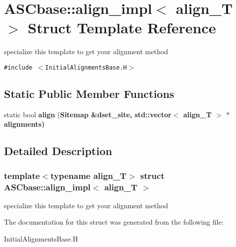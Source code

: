 \section{ASCbase::align\_\-impl$<$ align\_\-T $>$ Struct Template Reference}
\label{structASCbase_1_1align__impl}
specialize this template to get your alignment method  


{\tt \#include $<$Initial\-Alignments\-Base.H$>$}

\subsection*{Static Public Member Functions}
\begin{CompactItemize}
\item 
static bool \textbf{align} (\bf{Sitemap} \&dset\_\-site, std::vector$<$ align\_\-T $>$ $\ast$alignments)\label{structASCbase_1_1align__impl_7a67a2011c08aa8b8888af4a9aed4c66}

\end{CompactItemize}


\subsection{Detailed Description}
\subsubsection*{template$<$typename align\_\-T$>$ struct ASCbase::align\_\-impl$<$ align\_\-T $>$}

specialize this template to get your alignment method 



The documentation for this struct was generated from the following file:\begin{CompactItemize}
\item 
Initial\-Alignments\-Base.H\end{CompactItemize}
